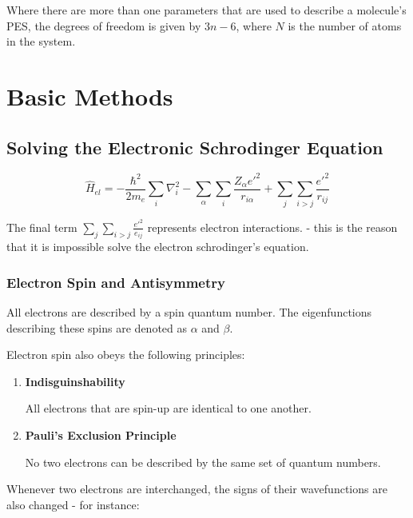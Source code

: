 \documentclass[
  letterpaper,
  DIV=11,
  numbers=noendperiod]{scrreprt}
\begin{document}
Where there are more than one parameters that are used to describe a
molecule's PES, the degrees of freedom is given by \(3n - 6\), where
\(N\) is the number of atoms in the system.

\hypertarget{basic-methods}{%
\section{Basic Methods}\label{basic-methods}}

\hypertarget{solving-the-electronic-schrodinger-equation}{%
\subsection{Solving the Electronic Schrodinger
Equation}\label{solving-the-electronic-schrodinger-equation}}

\begin{equation}
  \hat{H}_{el} = -\frac{\hbar^2}{2m_e}\sum_i\nabla_i^2 - \sum_\alpha\sum_i\frac{Z_\alpha e'^2}{r_{i\alpha}} + \sum_j\sum_{i > j}\frac{e'^2}{r_{ij}}
\end{equation}

The final term \(\displaystyle \sum_j\sum_{i > j}\frac{e'^2}{e_{ij}}\)
represents electron interactions. - this is the reason that it is
impossible solve the electron schrodinger's equation.

\hypertarget{electron-spin-and-antisymmetry}{%
\subsubsection{Electron Spin and
Antisymmetry}\label{electron-spin-and-antisymmetry}}

All electrons are described by a spin quantum number. The eigenfunctions
describing these spins are denoted as \(\alpha\) and \(\beta\).

Electron spin also obeys the following principles:

\begin{enumerate}
\def\labelenumi{\arabic{enumi}.}
\item
  \textbf{Indisguinshability}

  All electrons that are spin-up are identical to one another.
\item
  \textbf{Pauli's Exclusion Principle}

  No two electrons can be described by the same set of quantum numbers.
\end{enumerate}

Whenever two electrons are interchanged, the signs of their
wavefunctions are also changed - for instance:
\end{document}
